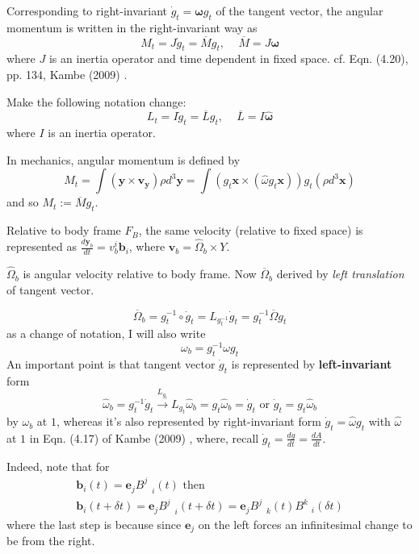 \documentclass[10pt]{amsart}
\begin{document}
\begin{multicols*}{2}
Corresponding to right-invariant $\dot{g}_t = \mathbf{\omega} g_t$ of the tangent vector, the angular momentum is written in the right-invariant way as 
\begin{equation}
M_t = J \dot{g}_t = \overline{M} g_t, \quad \, \overline{M} = J \mathbf{\omega}
\end{equation}
where $J$ is an inertia operator and time dependent in fixed space. cf. Eqn. (4.20), pp. 134, Kambe (2009) \cite{TKambe2009}.

Make the following notation change:
\begin{equation}
L_t = I\dot{g}_t = \overline{L} g_t, \quad \, \overline{L} = I \widehat{\mathbf{\omega}}
\end{equation}
where $I$ is an inertia operator.

In mechanics, angular momentum is defined by 
\[
M_t = \int (\mathbf{y} \times \mathbf{v}_{\mathbf{y}} ) \rho d^3 \mathbf{y} = \int (g_t \mathbf{x} \times (\widehat{\omega} g_t \mathbf{x} ) ) g_t (\rho d^3 \mathbf{x} )
\]
and so $M_t := \overline{M} g_t$.

Relative to body frame $F_B$, the same velocity (relative to fixed space) is represented as $\frac{d\mathbf{y}_b}{dt} = v_b^i \mathbf{b}_i$, where $\mathbf{v}_b = \widehat{\Omega}_b \times Y$.

$\widehat{\Omega}_b$ is angular velocity relative to body frame. Now $\overline{\Omega}_b$ derived by \emph{left translation} of tangent vector. 

\begin{equation}
\overline{\Omega}_b = g^{-1}_t \circ \dot{g}_t = L_{g^{-1}_t} \dot{g}_t = g^{-1}_t \overline{\Omega} g_t
\end{equation}
as a change of notation, I will also write
\[
\omega_b = g^{-1}_t \omega g_t
\]
An important point is that tangent vector $\dot{g}_t$ is represented by \textbf{left-invariant} form
\[
\widehat{\omega}_b = g_t^{-1} \dot{g}_t \xrightarrow{ L_{g_t} } L_{g_t} \widehat{\omega}_b = g_t \widehat{\omega}_b = \dot{g}_t \text{ or } \dot{g}_t = g_t \widehat{\omega}_b
\]
by $\omega_b$ at $1$, whereas it's also represented by right-invariant form $\dot{g}_t = \widehat{\omega} g_t$ with $\widehat{\omega}$ at $1$ in Eqn. (4.17) of  Kambe (2009) \cite{TKambe2009}, where, recall $\dot{g}_t = \frac{dg}{dt} = \frac{dA}{dt}$.

Indeed, note that for 
\[
\begin{gathered}
	\mathbf{b}_i(t) = \mathbf{e}_j B^j_{\quad i}(t) \text{ then } \\
	\mathbf{b}_i(t+ \delta t) = \mathbf{e}_j B^j_{\quad i}(t+ \delta t) = \mathbf{e}_j B^j_{\quad k} (t) B^k_{\quad i}(\delta t)
\end{gathered}
\]
where the last step is because since $\mathbf{e}_j$ on the left forces an infinitesimal change to be from the right.


\end{multicols*}
\end{document}
